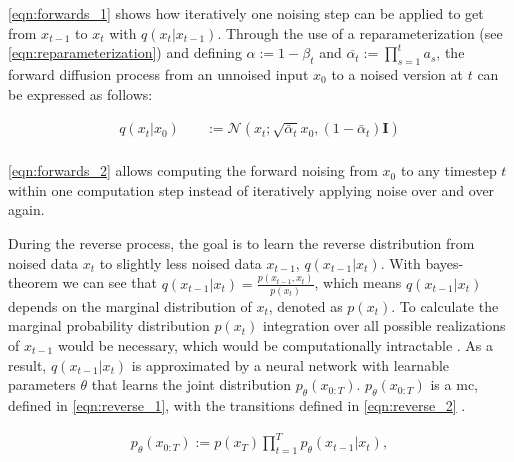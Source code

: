 \autoref{eqn:forwards_1} \cite{ho2020DenoisingDiffusionProbabilistic} shows how iteratively one noising step can be applied to get from $x_{t-1}$ to $x_t$ with $q(x_t | x_{t-1})$.
Through the use of a reparameterization (see \autoref{eqn:reparameterization}) and defining $\alpha := 1-\beta_t$ and $\overline{\alpha_t}:=\prod_{s=1}^{t}a_s$, 
the forward diffusion process from an unnoised input $x_0$ to a noised version at $t$ can be expressed as follows:

\begin{equation}
  \label{eqn:forwards_2}
  \begin{align*}
    q(x_t | x_0) \quad & := \mathcal{N}(x_t; \sqrt{\bar{\alpha}_t} x_0, (1 - \bar{\alpha}_t) \textbf{I})\\
  \end{align*}
\end{equation}

\autoref{eqn:forwards_2} \cite{ho2020DenoisingDiffusionProbabilistic} allows computing the forward noising from $x_0$ to any timestep $t$ within one computation step instead of iteratively applying noise over and over again.

During the reverse process, the goal is to learn the reverse distribution from noised data $x_t$ to slightly less noised data $x_{t-1}$, $q(x_{t-1}|x_t)$.
With bayes-theorem we can see that $q(x_{t-1}|x_t) = \frac{p(x_{t-1},x_t)}{p(x_t)}$, which means $q(x_{t-1}|x_t)$ depends on the marginal distribution of $x_t$, denoted as $p(x_t)$.
To calculate the marginal probability distribution $p(x_t)$ integration over all possible realizations of $x_{t-1}$ would be necessary, which would be computationally intractable \cite{capel2022MasterThesisDenoising}.
As a result, $q(x_{t-1}|x_t)$ is approximated by a neural network with learnable parameters $\theta$ that learns the joint distribution $p_{\theta}(x_{0:T})$.
$p_{\theta}(x_{0:T})$ is a \gls{mc}, defined in \autoref{eqn:reverse_1}, with the transitions defined in \autoref{eqn:reverse_2} \cite{capel2022MasterThesisDenoising, ho2020DenoisingDiffusionProbabilistic}.

\begin{equation}
  \label{eqn:reverse_1}
  \begin{align*}
    p_{\theta}(x_{0:T}) := p(x_T) \prod_{t=1}^T p_{\theta}(x_{t-1} | x_t),
  \end{align*}
\end{equation}

